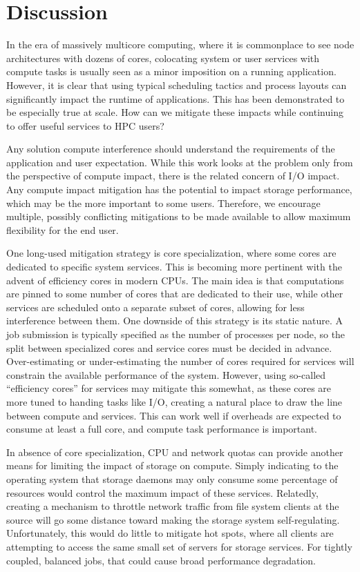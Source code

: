 \section{Discussion}

In the era of massively multicore computing, where it is commonplace to see node architectures with dozens of cores, colocating system or user services with compute tasks is usually seen as a minor imposition on a running application. However, it is clear that using typical scheduling tactics and process layouts can significantly impact the runtime of applications. This has been demonstrated to be especially true at scale. How can we mitigate these impacts while continuing to offer useful services to HPC users?

Any solution compute interference should understand the requirements of the application and user expectation. While this work looks at the problem only from the perspective of compute impact, there is the related concern of I/O impact. Any compute impact mitigation has the potential to impact storage performance, which may be the more important to some users. Therefore, we encourage multiple, possibly conflicting mitigations to be made available to allow maximum flexibility for the end user.

One long-used mitigation strategy is core specialization, where some cores are dedicated to specific system services. This is becoming more pertinent with the advent of efficiency cores in modern CPUs. The main idea is that computations are pinned to some number of cores that are dedicated to their use, while other services are scheduled onto a separate subset of cores, allowing for less interference between them. One downside of this strategy is its static nature. A job submission is typically specified as the number of processes per node, so the split between specialized cores and service cores must be decided in advance. Over-estimating or under-estimating the number of cores required for services will constrain the available performance of the system. However, using so-called ``efficiency cores'' for services may mitigate this somewhat, as these cores are more tuned to handing tasks like I/O, creating a natural place to draw the line between compute and services. This can work well if overheads are expected to consume at least a full core, and compute task performance is important.

In absence of core specialization, CPU and network quotas can provide another means for limiting the impact of storage on compute. Simply indicating to the operating system that storage daemons may only consume some percentage of resources would control the maximum impact of these services. Relatedly, creating a mechanism to throttle network traffic from file system clients at the source will go some distance toward making the storage system self-regulating. Unfortunately, this would do little to mitigate hot spots, where all clients are attempting to access the same small set of servers for storage services. For tightly coupled, balanced jobs, that could cause broad performance degradation.

